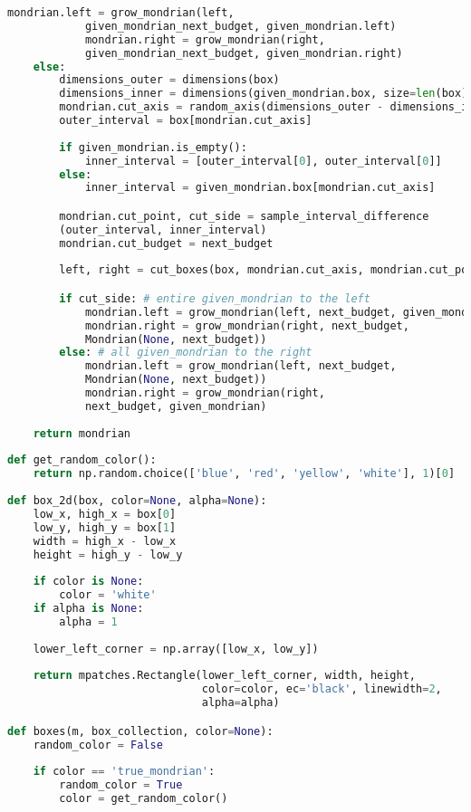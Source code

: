 \begin{lstlisting}[language=Python]
            mondrian.left = grow_mondrian(left, 
            given_mondrian_next_budget, given_mondrian.left)
            mondrian.right = grow_mondrian(right, 
            given_mondrian_next_budget, given_mondrian.right)
    else:
        dimensions_outer = dimensions(box)
        dimensions_inner = dimensions(given_mondrian.box, size=len(box))
        mondrian.cut_axis = random_axis(dimensions_outer - dimensions_inner)
        outer_interval = box[mondrian.cut_axis]
        
        if given_mondrian.is_empty():
            inner_interval = [outer_interval[0], outer_interval[0]]
        else:
            inner_interval = given_mondrian.box[mondrian.cut_axis]

        mondrian.cut_point, cut_side = sample_interval_difference
        (outer_interval, inner_interval)
        mondrian.cut_budget = next_budget
        
        left, right = cut_boxes(box, mondrian.cut_axis, mondrian.cut_point)

        if cut_side: # entire given_mondrian to the left
            mondrian.left = grow_mondrian(left, next_budget, given_mondrian)
            mondrian.right = grow_mondrian(right, next_budget, 
            Mondrian(None, next_budget))
        else: # all given_mondrian to the right
            mondrian.left = grow_mondrian(left, next_budget, 
            Mondrian(None, next_budget))
            mondrian.right = grow_mondrian(right, 
            next_budget, given_mondrian)
            
    return mondrian
    
def get_random_color():
    return np.random.choice(['blue', 'red', 'yellow', 'white'], 1)[0]
    
def box_2d(box, color=None, alpha=None):
    low_x, high_x = box[0]
    low_y, high_y = box[1]
    width = high_x - low_x
    height = high_y - low_y
    
    if color is None:
        color = 'white'
    if alpha is None:
        alpha = 1
        
    lower_left_corner = np.array([low_x, low_y])
    
    return mpatches.Rectangle(lower_left_corner, width, height, 
                              color=color, ec='black', linewidth=2, 
                              alpha=alpha)

def boxes(m, box_collection, color=None):
    random_color = False
    
    if color == 'true_mondrian':
        random_color = True
        color = get_random_color()
    

\end{lstlisting}

